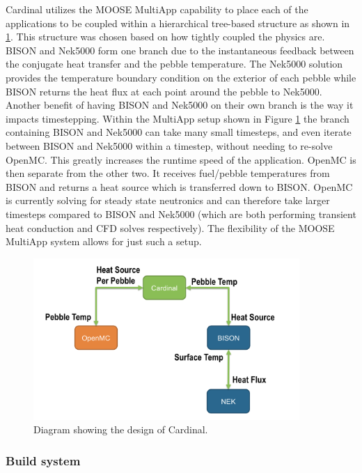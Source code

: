 Cardinal utilizes the MOOSE MultiApp capability to place each of the applications to be coupled within a hierarchical tree-based structure as shown in \ref{f:cardinal}. This structure was chosen based on how tightly coupled the physics are. BISON and Nek5000 form one branch due to the instantaneous feedback between the conjugate heat transfer and the pebble temperature. The Nek5000 solution provides the temperature boundary condition on the exterior of each pebble while BISON returns the heat  flux at each point around the pebble to Nek5000. Another benefit of having BISON and Nek5000 on their own branch is the way it impacts timestepping. Within the MultiApp setup shown in Figure \ref{f:cardinal} the branch containing BISON and Nek5000 can take many small timesteps, and even iterate between BISON and Nek5000 within a timestep, without needing to re-solve OpenMC. This greatly increases the runtime speed of the application. OpenMC is then separate from the other two. It receives fuel/pebble temperatures from BISON and returns a heat source which is transferred down to BISON. OpenMC is currently solving for steady state neutronics and can therefore take larger timesteps compared to BISON and Nek5000 (which are both performing transient heat conduction and CFD solves respectively). The flexibility of the MOOSE MultiApp system allows for just such a setup.

\begin{figure}[!h]
\centering
\includegraphics[clip=true,width=0.9\textwidth]{Figures/cardinal}
\caption{Diagram showing the design of Cardinal.}
\label{f:cardinal}
\end{figure}


\subsubsection{Build system}
\label{ss:c2}

